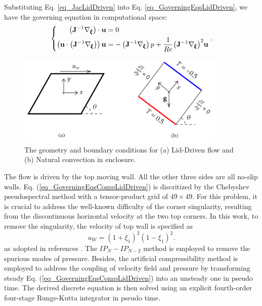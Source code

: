 \documentclass[preprint, 10pt]{elsarticle}
\begin{document}
Substituting Eq. \ref{eq_JacLidDriven} into Eq. \ref {eq_GoverningEqsLidDriven}, we have the governing equation in computational space:
\begin{equation}
\left \{
\begin{aligned}
\left(\mathbf{J}^{-1} \nabla_{\pmb {\xi}}\right)  \cdot {\bf{u}} &= 0 \\
\left( {{\bf{u}} \cdot \left(\mathbf{J}^{-1} \nabla_{\pmb {\xi}}\right) } \right){\bf{u}} &=  - \left(\mathbf{J}^{-1} \nabla_{\pmb {\xi}}\right) p + \frac{1}{Re}{\left(\mathbf{J}^{-1} \nabla_{\pmb {\xi}}\right) ^2}{\bf{u}}
\end{aligned}
\right .
.
\label{eq_GoverningEqsCompLidDriven}
\end{equation}


\begin{figure}[!ht]
    \centering
    \includegraphics[width=10cm]{..//fig/geometry.pdf}
    \caption{The geometry and boundary conditions for (a) Lid-Driven flow and (b) Natural convection in enclosure.}
    \label{fig_geometry}
\end{figure}


The flow is driven by the top moving wall. All the other three sides are all no-slip walls. Eq. (\ref{eq_GoverningEqsCompLidDriven}) is discritized by the Chebyshev pseudospectral method with a tensor-product grid of $49 \times 49$.
For this problem, it is crucial to address the well-known difficulty of the corner singularity, resulting from the discontinuous horizontal velocity at the two top corners. In this work, to remove the singularity, the velocity of top wall is specified as
\begin{equation}
u_W = (1+\xi_1)^2(1-\xi_1)^2.
\end{equation}
as adopted in references \cite{shen1991hopf, pinelli1994chebyshev, phillips1993treatment}. The $IP_{N}-IP_{N-2}$ method \cite{zhang2010explicit, peyret2013spectral} is employed to remove the spurious modes of pressure.
Besides, the artificial compressibility method \cite{clausen2013entropically} is employed to address the coupling  of velocity field and pressure by  transforming steady  Eq. (\ref{eq_GoverningEqsCompLidDriven}) into an unsteady one in pseudo time. The derived discrete equation is then solved using an explicit fourth-order four-stage Runge-Kutta integrator in pseudo time.
\end{document}
